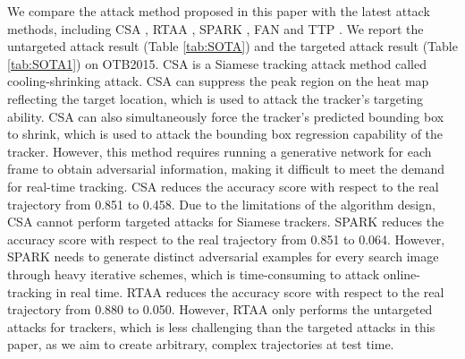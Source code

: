 \documentclass[journal]{IEEEtran}
\begin{document}
We compare the attack method proposed in this paper with the latest attack methods, including CSA \cite{CSA}, RTAA \cite{RTAA}, SPARK \cite{SPARK}, FAN \cite{FAN} and TTP \cite{TTP}. We report the untargeted attack result (Table \ref{tab:SOTA}) and the targeted attack result (Table \ref{tab:SOTA1}) on OTB2015. CSA \cite{CSA} is a Siamese tracking attack method called cooling-shrinking attack. CSA can suppress the peak region on the heat map reflecting the target location, which is used to attack the tracker's targeting ability. CSA can also simultaneously force the tracker's predicted bounding box to shrink, which is used to attack the bounding box regression capability of the tracker. However, this method requires running a generative network for each frame to obtain adversarial information, making it difficult to meet the demand for real-time tracking. CSA reduces the accuracy score with respect to the real trajectory from 0.851 to 0.458. Due to the limitations of the algorithm design, CSA cannot perform targeted attacks for Siamese trackers. 
SPARK \cite{SPARK} reduces the accuracy score with respect to the real trajectory from 0.851 to 0.064. However, SPARK needs to generate distinct adversarial examples for every search image through heavy iterative schemes, which is time-consuming to attack online-tracking in real time.
RTAA \cite{RTAA} reduces the accuracy score with respect to the real trajectory from 0.880 to 0.050. However, RTAA only performs the untargeted attacks for trackers, which is less challenging than the targeted attacks in this paper, as we aim to create arbitrary, complex trajectories at test time. 
\end{document}
